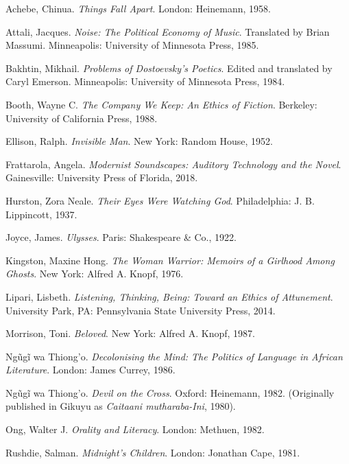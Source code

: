 \documentclass[12pt]{report}
\begin{document}
\begin{thebibliography}{99}
 Achebe, Chinua. \textit{Things Fall Apart}. London: Heinemann, 1958.

 Attali, Jacques. \textit{Noise: The Political Economy of Music}. Translated by Brian Massumi. Minneapolis: University of Minnesota Press, 1985.

 Bakhtin, Mikhail. \textit{Problems of Dostoevsky’s Poetics}. Edited and translated by Caryl Emerson. Minneapolis: University of Minnesota Press, 1984.

 Booth, Wayne C. \textit{The Company We Keep: An Ethics of Fiction}. Berkeley: University of California Press, 1988.

 Ellison, Ralph. \textit{Invisible Man}. New York: Random House, 1952.

 Frattarola, Angela. \textit{Modernist Soundscapes: Auditory Technology and the Novel}. Gainesville: University Press of Florida, 2018.

 Hurston, Zora Neale. \textit{Their Eyes Were Watching God}. Philadelphia: J. B. Lippincott, 1937.

 Joyce, James. \textit{Ulysses}. Paris: Shakespeare & Co., 1922.

 Kingston, Maxine Hong. \textit{The Woman Warrior: Memoirs of a Girlhood Among Ghosts}. New York: Alfred A. Knopf, 1976.

 Lipari, Lisbeth. \textit{Listening, Thinking, Being: Toward an Ethics of Attunement}. University Park, PA: Pennsylvania State University Press, 2014.

 Morrison, Toni. \textit{Beloved}. New York: Alfred A. Knopf, 1987.

 Ngũgĩ wa Thiong'o. \textit{Decolonising the Mind: The Politics of Language in African Literature}. London: James Currey, 1986.

 Ngũgĩ wa Thiong'o. \textit{Devil on the Cross}. Oxford: Heinemann, 1982. (Originally published in Gikuyu as \textit{Caitaani mutharaba-Ini}, 1980).

 Ong, Walter J. \textit{Orality and Literacy}. London: Methuen, 1982.

 Rushdie, Salman. \textit{Midnight’s Children}. London: Jonathan Cape, 1981.


\end{thebibliography}
\end{document}
